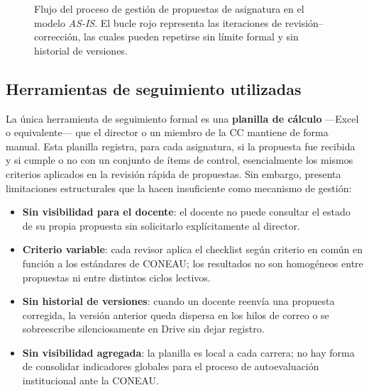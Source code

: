 \begin{figure}[!h]
\caption{Flujo del proceso de gestión de propuestas de asignatura en el modelo \textit{AS-IS}.
  El bucle \textcolor{Micolor1}{rojo} representa las iteraciones de revisión--corrección,
  las cuales pueden repetirse sin límite formal y sin historial de versiones.}
\label{fig:flujo_asis}
\end{figure}

\subsection{Herramientas de seguimiento utilizadas}
\label{subsec:herramientas_asis}

La única herramienta de seguimiento formal es una \textbf{planilla de cálculo} ---Excel o equivalente--- que el director o un miembro de la CC mantiene de forma manual. Esta planilla registra, para cada asignatura, si la propuesta fue recibida y si cumple o no con un conjunto de ítems de control, esencialmente los mismos criterios aplicados en la revisión rápida de propuestas. Sin embargo, presenta limitaciones estructurales que la hacen insuficiente como mecanismo de gestión:

\begin{itemize}
    \item \textbf{Sin visibilidad para el docente}: el docente no puede consultar el estado de su propia propuesta sin solicitarlo explícitamente al director.

    \item \textbf{Criterio variable}: cada revisor aplica el checklist según criterio en común en función a los estándares de CONEAU; los resultados no son homogéneos entre propuestas ni entre distintos ciclos lectivos.

    \item \textbf{Sin historial de versiones}: cuando un docente reenvía una propuesta corregida, la versión anterior queda dispersa en los hilos de correo o se sobreescribe silenciosamente en Drive sin dejar registro.

    \item \textbf{Sin visibilidad agregada}: la planilla es local a cada carrera; no hay forma de consolidar indicadores globales para el proceso de autoevaluación institucional ante la CONEAU.
\end{itemize}

